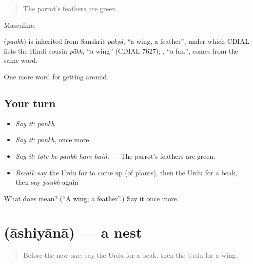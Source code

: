 \begin{quote}
The parrot's feathers are green.
\end{quote}

Masculine.

\begin{cousinweb}
\textbf{} (\emph{pankh}) is inherited from Sanskrit \emph{pakṣá}, \textquotedblleft{}a wing, a feather\textquotedblright{}, under which CDIAL lists the Hindi cousin \emph{pā̃kh}, \textquotedblleft{}a wing\textquotedblright{} (CDIAL 7627); \textbf{}, \textquotedblleft{}a fan\textquotedblright{}, comes from the same word.
\end{cousinweb}

\begin{grammarlens}[title={What you've built}]
One more word for getting around.
\end{grammarlens}

\subsection*{Your turn}
\begin{itemize}
\raggedright
  \item \emph{Say it:} \emph{pankh}
  \item \emph{Say it:} \emph{pankh}, once more
  \item \emph{Say it:} \emph{tote ke pankh hare haiṅ.} — The parrot's feathers are green.
  \item \emph{Recall:} say the Urdu for to come up (of plants), then the Urdu for a beak, then say \emph{pankh} again
\end{itemize}

\begin{tcolorbox}[breakable,colback=teal!4,colframe=teal!35!black,title={Before you move on}]
What does  mean? (\textquotedblleft{}A wing; a feather\textquotedblright{}.) Say it once more.
\end{tcolorbox}
\section[\texorpdfstring{\ur{آشیانہ} (āshiyānā)}{آشیانہ (āshiyānā)}]{ (āshiyānā) — a nest}

\label{lesson:UR-C438-ashiyana}



\begin{quote}
Before the new one: say the Urdu for a beak, then the Urdu for a wing.
\end{quote}


